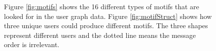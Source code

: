 \begin{figure}[!h]
	\centering
    
\caption{ Figure \ref{fig:motifs} shows the 16 different types of motifs that are looked for in the user graph data. Figure \ref{fig:motifStruct} shows how three unique users could produce different motifs. The three shapes represent different users and the dotted line means the message order is irrelevant.}
	\label{Fig:motifs}
\end{figure}

